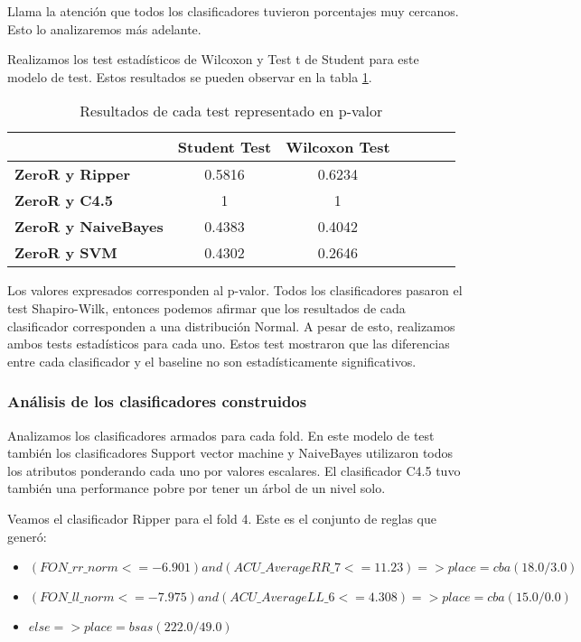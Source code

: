 Llama la atención que todos los clasificadores tuvieron porcentajes muy cercanos. Esto lo analizaremos más adelante. 

Realizamos los test estadísticos de Wilcoxon y Test t de Student para este modelo de test. Estos resultados se pueden observar en la tabla  \ref{HPTDT_res_tests_wilcoxon_student}.

\begin{table}[H]
	\centering
	\begin{tabular}{|l|c|c|c|c|c|c|}
		\hline
		\textbf{}  & \textbf{Student Test} & \textbf{Wilcoxon Test} \\ \hline
		\textbf{ZeroR y Ripper}  & 0.5816 & 0.6234 \\ \hline
		\textbf{ZeroR y C4.5}  & 1 & 1 \\ \hline
		\textbf{ZeroR y NaiveBayes}  & 0.4383 & 0.4042 \\ \hline
		\textbf{ZeroR y SVM}  & 0.4302 & 0.2646 \\ \hline
	\end{tabular}
	\caption{Resultados de cada test representado en p-valor}
	\label{HPTDT_res_tests_wilcoxon_student}
\end{table}

Los valores expresados corresponden al p-valor. Todos los clasificadores pasaron el test Shapiro-Wilk, entonces podemos afirmar que los resultados de cada clasificador corresponden a una distribución Normal. A pesar de esto, realizamos ambos tests estadísticos para cada uno. Estos test mostraron que las diferencias entre cada clasificador y el baseline no son estadísticamente significativos.

\subsubsection{Análisis de los clasificadores construidos}

Analizamos los clasificadores armados para cada fold. En este modelo de test también los clasificadores Support vector machine y NaiveBayes utilizaron todos los atributos ponderando cada uno por valores escalares. El clasificador C4.5 tuvo también una performance pobre por tener un árbol de un nivel solo. 

Veamos el clasificador Ripper para el fold 4. Este es el conjunto de reglas que generó:

\begin{flushleft}
	\begin{itemize}
		\item $(FON\_rr\_norm <= -6.901) and (ACU\_AverageRR\_7 <= 11.23) => place=cba (18.0/3.0)$ \\
		\item $(FON\_ll\_norm <= -7.975) and (ACU\_AverageLL\_6 <= 4.308) => place=cba (15.0/0.0)$
		\item $else => place=bsas (222.0/49.0)$
	\end{itemize}
\end{flushleft}

